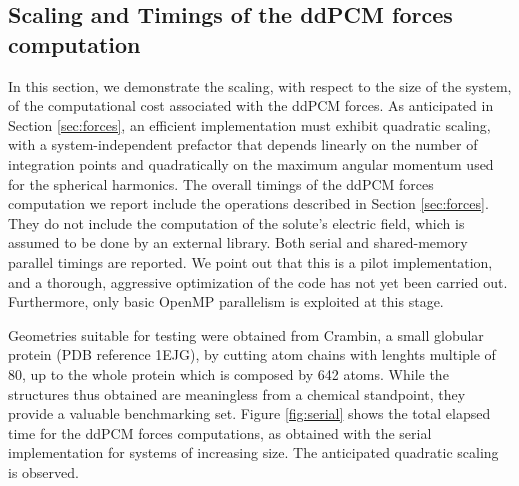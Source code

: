 \documentclass[aip,jcp,a4paper,11pt]{revtex4-1}
\begin{document}


% 





\subsection{Scaling and Timings of the ddPCM forces computation}
In this section, we demonstrate the scaling, with respect to the size of the system, of the computational cost associated with the ddPCM forces. As anticipated in Section \ref{sec:forces}, an efficient implementation must exhibit quadratic scaling, \color{red}with a system-independent prefactor that depends linearly on the number of integration points and quadratically on the maximum angular momentum used for the spherical harmonics\color{black}. The overall timings of the ddPCM forces computation we report include the operations described in Section \ref{sec:forces}. They do not include the computation of the solute's electric field, which is assumed to be done by an external library. Both serial and shared-memory parallel timings are reported. We point out that this is a pilot implementation, and a thorough, aggressive optimization of the code has not yet been carried out. Furthermore, only basic OpenMP parallelism is exploited at this stage.

Geometries suitable for testing were obtained from Crambin, a small globular protein (PDB reference 1EJG), by cutting atom chains with lenghts multiple of 80, up to the whole protein which is composed by 642 atoms. While the structures thus obtained are meaningless from a chemical standpoint, they provide a valuable benchmarking set. Figure \ref{fig:serial} shows the total elapsed time for the ddPCM forces computations, as obtained with the serial implementation for systems of increasing size. The anticipated quadratic scaling is observed.
\end{document}
